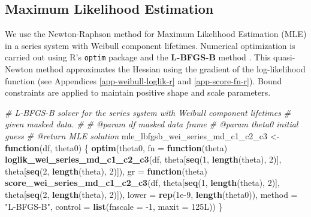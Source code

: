 \documentclass[
]{article}
\newenvironment{Shaded}{\begin{snugshade}}{\end{snugshade}}
\newcommand{\CommentTok}[1]{\textcolor[rgb]{0.56,0.35,0.01}{\textit{#1}}}
\newcommand{\ControlFlowTok}[1]{\textcolor[rgb]{0.13,0.29,0.53}{\textbf{#1}}}
\newcommand{\DataTypeTok}[1]{\textcolor[rgb]{0.13,0.29,0.53}{#1}}
\newcommand{\DecValTok}[1]{\textcolor[rgb]{0.00,0.00,0.81}{#1}}
\newcommand{\FloatTok}[1]{\textcolor[rgb]{0.00,0.00,0.81}{#1}}
\newcommand{\KeywordTok}[1]{\textcolor[rgb]{0.13,0.29,0.53}{\textbf{#1}}}
\newcommand{\NormalTok}[1]{#1}
\newcommand{\StringTok}[1]{\textcolor[rgb]{0.31,0.60,0.02}{#1}}
\theoremstyle{definition}
\theoremstyle{plain}
\theoremstyle{definition}
\theoremstyle{definition}
\theoremstyle{definition}
\theoremstyle{definition}
\theoremstyle{remark}
\begin{document}
\hypertarget{app-mle-r}{%
\subsection{Maximum Likelihood Estimation}\label{app-mle-r}}

We use the Newton-Raphson method for Maximum Likelihood Estimation (MLE) in a
series system with Weibull component lifetimes. Numerical optimization is
carried out using R's \texttt{optim} package and the \textbf{L-BFGS-B} method \citep{byrd1995}.
This quasi-Newton method approximates the Hessian using the gradient of the
log-likelihood function (see Appendices \ref{app-weibull-loglik-r} and
\ref{app-score-fn-r}). Bound constraints are applied to maintain positive
shape and scale parameters.

\begin{Shaded}
\begin{Highlighting}[]
\CommentTok{\#\textquotesingle{} L{-}BFGS{-}B solver for the series system with Weibull component lifetimes}
\CommentTok{\#\textquotesingle{} given masked data.}
\CommentTok{\#\textquotesingle{}}
\CommentTok{\#\textquotesingle{} @param df masked data frame}
\CommentTok{\#\textquotesingle{} @param theta0 initial guess}
\CommentTok{\#\textquotesingle{} @return MLE solution}
\NormalTok{mle\_lbfgsb\_wei\_series\_md\_c1\_c2\_c3 \textless{}{-}}\StringTok{ }\ControlFlowTok{function}\NormalTok{(df, theta0) \{}
  \KeywordTok{optim}\NormalTok{(theta0,}
    \DataTypeTok{fn =} \ControlFlowTok{function}\NormalTok{(theta) }\KeywordTok{loglik\_wei\_series\_md\_c1\_c2\_c3}\NormalTok{(df,}
\NormalTok{      theta[}\KeywordTok{seq}\NormalTok{(}\DecValTok{1}\NormalTok{, }\KeywordTok{length}\NormalTok{(theta), }\DecValTok{2}\NormalTok{)], theta[}\KeywordTok{seq}\NormalTok{(}\DecValTok{2}\NormalTok{, }\KeywordTok{length}\NormalTok{(theta), }\DecValTok{2}\NormalTok{)]),}
    \DataTypeTok{gr =} \ControlFlowTok{function}\NormalTok{(theta) }\KeywordTok{score\_wei\_series\_md\_c1\_c2\_c3}\NormalTok{(df,}
\NormalTok{      theta[}\KeywordTok{seq}\NormalTok{(}\DecValTok{1}\NormalTok{, }\KeywordTok{length}\NormalTok{(theta), }\DecValTok{2}\NormalTok{)], theta[}\KeywordTok{seq}\NormalTok{(}\DecValTok{2}\NormalTok{, }\KeywordTok{length}\NormalTok{(theta), }\DecValTok{2}\NormalTok{)]),}
    \DataTypeTok{lower =} \KeywordTok{rep}\NormalTok{(}\FloatTok{1e{-}9}\NormalTok{, }\KeywordTok{length}\NormalTok{(theta0)),}
    \DataTypeTok{method =} \StringTok{"L{-}BFGS{-}B"}\NormalTok{,}
    \DataTypeTok{control =} \KeywordTok{list}\NormalTok{(}\DataTypeTok{fnscale =} \DecValTok{{-}1}\NormalTok{, }\DataTypeTok{maxit =}\NormalTok{ 125L))}
\NormalTok{\}}
\end{Highlighting}
\end{Shaded}
\end{document}

